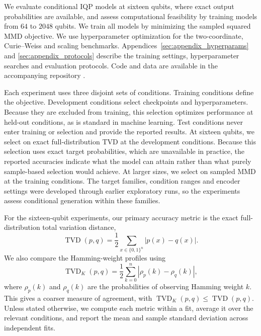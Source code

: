 \documentclass[pra,aps,10pt,twocolumn,floatfix,superscriptaddress, notitlepage,longbibliography]{revtex4-2}
\begin{document}
We evaluate conditional IQP models at sixteen qubits, where exact output probabilities are available, and assess computational feasibility by training models from $64$ to $2048$ qubits. We train all models by minimizing the sampled squared MMD objective. We use hyperparameter optimization for the two-coordinate, Curie--Weiss and scaling benchmarks. Appendices~\ref{sec:appendix_hyperparams} and \ref{sec:appendix_protocols} describe the training settings, hyperparameter searches and evaluation protocols. Code and data are available in the accompanying repository \cite{balloConditionalGenerationIQP2026}.

Each experiment uses three disjoint sets of conditions. Training conditions define the objective. Development conditions select checkpoints and hyperparameters. Because they are excluded from training, this selection optimizes performance at held-out conditions, as is standard in machine learning. Test conditions never enter training or selection and provide the reported results. At sixteen qubits, we select on exact full-distribution TVD at the development conditions. Because this selection uses exact target probabilities, which are unavailable in practice, the reported accuracies indicate what the model can attain rather than what purely sample-based selection would achieve. At larger sizes, we select on sampled MMD at the training conditions. The target families, condition ranges and encoder settings were developed through earlier exploratory runs, so the experiments assess conditional generation within these families.

For the sixteen-qubit experiments, our primary accuracy metric is the exact full-distribution total variation distance,
\begin{equation}
    \operatorname{TVD}(p,q)
    =\frac{1}{2}\sum_{x\in\{0,1\}^n}|p(x)-q(x)|.
    \label{eq:full-distribution-tvd}
\end{equation}
We also compare the Hamming-weight profiles using
\begin{equation}
    \operatorname{TVD}_K(p,q)
    =\frac{1}{2}\sum_{k=0}^{n}|\rho_p(k)-\rho_q(k)|,
\end{equation}
where $\rho_p(k)$ and $\rho_q(k)$ are the probabilities of observing Hamming weight $k$. This gives a coarser measure of agreement, with $\operatorname{TVD}_K(p,q)\leq\operatorname{TVD}(p,q)$. Unless stated otherwise, we compute each metric within a fit, average it over the relevant conditions, and report the mean and sample standard deviation across independent fits.
\end{document}
